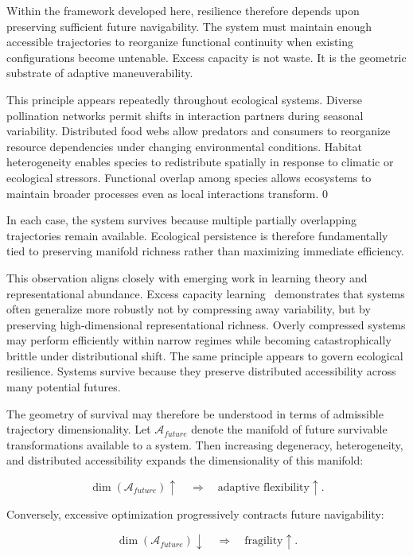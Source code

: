 \documentclass[11pt,a4paper]{article}
\newcommand{\Aspace}{\mathcal{A}}
\begin{document}
Within the framework developed here, resilience therefore depends upon preserving sufficient future navigability. The system must maintain enough accessible trajectories to reorganize functional continuity when existing configurations become untenable. Excess capacity is not waste. It is the geometric substrate of adaptive maneuverability.

This principle appears repeatedly throughout ecological systems. Diverse pollination networks permit shifts in interaction partners during seasonal variability. Distributed food webs allow predators and consumers to reorganize resource dependencies under changing environmental conditions. Habitat heterogeneity enables species to redistribute spatially in response to climatic or ecological stressors. Functional overlap among species allows ecosystems to maintain broader processes even as local interactions transform. 0

In each case, the system survives because multiple partially overlapping trajectories remain available. Ecological persistence is therefore fundamentally tied to preserving manifold richness rather than maximizing immediate efficiency.

This observation aligns closely with emerging work in learning theory and representational abundance. Excess capacity learning~\cite{Dubova2026} demonstrates that systems often generalize more robustly not by compressing away variability, but by preserving high-dimensional representational richness. Overly compressed systems may perform efficiently within narrow regimes while becoming catastrophically brittle under distributional shift. The same principle appears to govern ecological resilience. Systems survive because they preserve distributed accessibility across many potential futures.

The geometry of survival may therefore be understood in terms of admissible trajectory dimensionality. Let $\Aspace_{future}$ denote the manifold of future survivable transformations available to a system. Then increasing degeneracy, heterogeneity, and distributed accessibility expands the dimensionality of this manifold:

\[
\dim(\Aspace_{future}) \uparrow
\quad \Rightarrow \quad
\text{adaptive flexibility} \uparrow.
\]

Conversely, excessive optimization progressively contracts future navigability:

\[
\dim(\Aspace_{future}) \downarrow
\quad \Rightarrow \quad
\text{fragility} \uparrow.
\]
\end{document}
